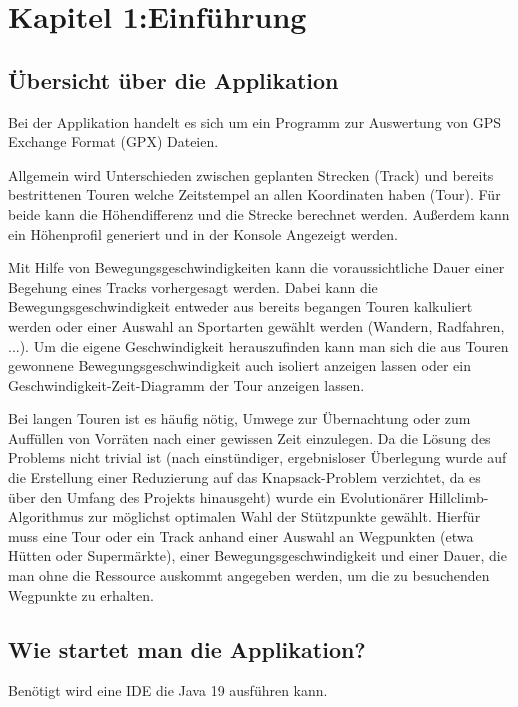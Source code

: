 \section{Kapitel 1:Einführung}


\subsection{Übersicht über die Applikation}

Bei der Applikation handelt es sich um ein Programm zur Auswertung von GPS Exchange Format (GPX) Dateien.

Allgemein wird Unterschieden zwischen geplanten Strecken (Track) und bereits bestrittenen Touren welche Zeitstempel an allen Koordinaten haben (Tour).
Für beide kann die Höhendifferenz und die Strecke berechnet werden. Außerdem kann ein Höhenprofil generiert und in der Konsole Angezeigt werden. %

Mit Hilfe von Bewegungsgeschwindigkeiten kann die voraussichtliche Dauer einer Begehung eines Tracks vorhergesagt werden. Dabei kann die Bewegungsgeschwindigkeit entweder aus bereits begangen Touren kalkuliert werden oder einer Auswahl an Sportarten gewählt werden (Wandern, Radfahren, ...).
Um die eigene Geschwindigkeit herauszufinden kann man sich die aus Touren gewonnene Bewegungsgeschwindigkeit auch isoliert anzeigen lassen oder ein Geschwindigkeit-Zeit-Diagramm der Tour anzeigen lassen.

Bei langen Touren ist es häufig nötig, Umwege zur Übernachtung oder zum Auffüllen von Vorräten nach einer gewissen Zeit einzulegen. 
Da die Lösung des Problems nicht trivial ist (nach einstündiger, ergebnisloser Überlegung wurde auf die Erstellung einer Reduzierung auf das Knapsack-Problem verzichtet, da es über den Umfang des Projekts hinausgeht) wurde ein Evolutionärer Hillclimb-Algorithmus zur möglichst optimalen Wahl der Stützpunkte gewählt.
Hierfür muss eine Tour oder ein Track anhand einer Auswahl an Wegpunkten (etwa Hütten oder Supermärkte), einer Bewegungsgeschwindigkeit und einer Dauer, die man ohne die Ressource auskommt angegeben werden, um die zu besuchenden Wegpunkte zu erhalten.


\subsection{Wie startet man die Applikation?}

Benötigt wird eine IDE die Java 19 ausführen kann.\\

